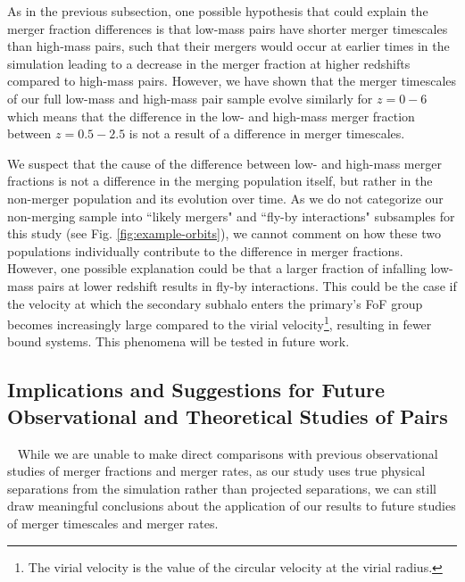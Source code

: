 \documentclass[twocolumn,linenumbers]{aastex631}
\begin{document}
        As in the previous subsection, one possible hypothesis that could explain the merger fraction differences is that low-mass pairs have shorter merger timescales than high-mass pairs, such that their mergers would occur at earlier times in the simulation leading to a decrease in the merger fraction at higher redshifts compared to high-mass pairs.
        However, we have shown that the merger timescales of our full low-mass and high-mass pair sample evolve similarly for $z=0-6$ which means that the difference in the low- and high-mass merger fraction between $z=0.5-2.5$ is not a result of a difference in merger timescales.
    
        We suspect that the cause of the difference between low- and high-mass merger fractions is not a difference in the merging population itself, but rather in the non-merger population and its evolution over time. 
        As we do not categorize our non-merging sample into ``likely mergers" and ``fly-by interactions" subsamples for this study (see Fig. \ref{fig:example-orbits}), we cannot comment on how these two populations individually contribute to the difference in merger fractions.
        However, one possible explanation could be that a larger fraction of infalling low-mass pairs at lower redshift results in fly-by interactions. 
        This could be the case if the velocity at which the secondary subhalo enters the primary's FoF group becomes increasingly large compared to the virial velocity\footnote{The virial velocity is the value of the circular velocity at the virial radius.}, resulting in fewer bound systems. 
        This phenomena will be tested in future work.


        
    \subsection{Implications and Suggestions for Future Observational and Theoretical Studies of Pairs}~\label{sec:disc-suggestions}
        While we are unable to make direct comparisons with previous observational studies of merger fractions and merger rates, as our study uses true physical separations from the simulation rather than projected separations, we can still draw meaningful conclusions about the application of our results to future studies of merger timescales and merger rates. 
    
\end{document}
